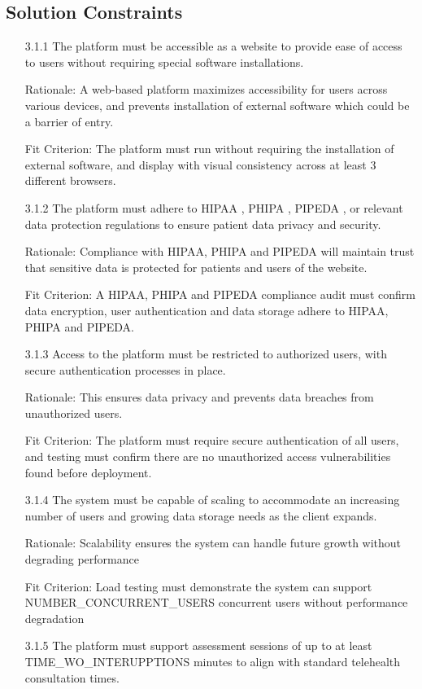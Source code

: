 \documentclass[12pt]{article}
\begin{document}
\subsection{Solution Constraints}
\begin{itemize}
  \item[3.1.1] The platform must be accessible as a website to provide ease of access to users without requiring special software installations.
  \item[] Rationale: A web-based platform maximizes accessibility for users across various devices, and prevents installation of external software which could be a barrier of entry.
  \item[] Fit Criterion: The platform must run without requiring the installation of external software, and display with visual consistency across at least 3 different browsers.
  \item[3.1.2] The platform must adhere to HIPAA \cite{hipaa}, PHIPA \cite{phipa}, PIPEDA \cite{pipeda}, or relevant data protection regulations to ensure patient data privacy and security.
  \item[] Rationale: Compliance with HIPAA, PHIPA and PIPEDA will maintain trust that sensitive data is protected for patients and users of the website.
  \item[] Fit Criterion: A HIPAA, PHIPA and PIPEDA compliance audit must confirm data encryption, user authentication and data storage adhere to HIPAA, PHIPA and PIPEDA.
  \item[3.1.3] Access to the platform must be restricted to authorized users, with secure authentication processes in place.
  \item[] Rationale: This ensures data privacy and prevents data breaches from unauthorized users.
  \item[] Fit Criterion: The platform must require secure authentication of all users, and testing must confirm there are no unauthorized access vulnerabilities found before deployment.
  \item[3.1.4] The system must be capable of scaling to accommodate an increasing number of users and growing data storage needs as the client expands.
  \item[] Rationale: Scalability ensures the system can handle future growth without degrading performance
  \item[] Fit Criterion: Load testing must demonstrate the system can support NUMBER\_CONCURRENT\_USERS concurrent users without performance degradation
  \item[3.1.5] The platform must support assessment sessions of up to at least\\ TIME\_WO\_INTERUPPTIONS minutes to align with standard telehealth consultation times.

\end{itemize}
\end{document}
